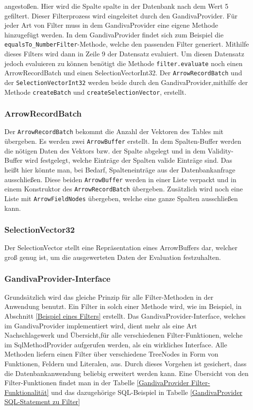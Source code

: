 angestoßen. Hier wird die Spalte spalte in der Datenbank nach dem Wert 5 gefiltert. Dieser Filterprozess wird eingeleitet durch den GandivaProvider.
Für jeder Art von Filter muss in dem GandivaProvider eine eigene Methode hinzugefügt werden. In dem GandivaProvider findet sich zum Beispiel die \texttt{equalsTo\_NumberFilter}-Methode, welche den passenden Filter generiert.
Mithilfe dieses Filters wird dann in Zeile 9 der Datensatz evaluiert. Um diesen Datensatz jedoch evaluieren zu können benötigt die Methode \texttt{filter.evaluate} noch einen ArrowRecordBatch und einen SelectionVectorInt32.
Der \texttt{ArrowRecordBatch} und der \texttt{SelectionVectorInt32} werden beide durch den GandivaProvider,mithilfe der Methode \texttt{createBatch} und \texttt{createSelectionVector}, erstellt.


\subsubsection{ArrowRecordBatch}

Der \texttt{ArrowRecordBatch} bekommt die Anzahl der Vektoren des Tables mit übergeben.
Es werden zwei \texttt{ArrowBuffer} erstellt. In dem Spalten-Buffer werden die nötigen Daten des Vektors bzw. der Spalte abgelegt und in dem Validity-Buffer wird festgelegt, welche Einträge der Spalten valide Einträge sind. Das heißt hier könnte man, bei Bedarf, Spalteneinträge aus der Datenbankanfrage ausschließen.
Diese beiden \texttt{ArrowBuffer} werden in einer Liste verpackt und in einem Konstruktor des \texttt{ArrowRecordBatch} übergeben. Zusätzlich wird noch eine Liste mit \texttt{ArrowFieldNodes} übergeben, welche eine ganze Spalten ausschließen kann.

\subsubsection{SelectionVector32}

Der SelectionVector stellt eine Repräsentation eines ArrowBuffers dar, welcher groß genug ist, um die ausgewerteten Daten der Evaluation festzuhalten.


\subsubsection{GandivaProvider-Interface}
Grundsätzlich wird das gleiche Prinzip für alle Filter-Methoden in der Anwendung benutzt. Ein Filter in solch einer Methode wird, wie im Beispiel, in Abschnitt \ref{Beispiel eines Filters} erstellt. Das GandivaProvider-Interface, welches im GandivaProvider implementiert wird, dient mehr als eine Art Nachschlagewerk und Übersicht,für alle verschiedenen Filter-Funktionen, welche im SqlMethodProvider aufgerufen werden, als ein wirkliches Interface.
Alle Methoden liefern einen Filter über verschiedene TreeNodes in Form von Funktionen, Feldern und Literalen, aus. Durch dieses Vorgehen ist gesichert, dass die Datenbankanwendung beliebig erweitert werden kann.
Eine Übersicht von den Filter-Funktionen findet man in der Tabelle \ref{GandivaProvider Filter-Funktionalität} und das dazugehörige SQL-Beispiel  in Tabelle \ref{GandivaProvider SQL-Statement zu Filter}

